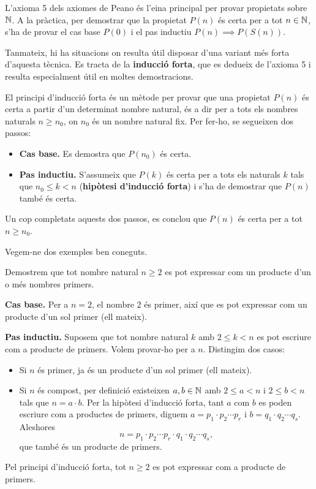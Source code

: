 L'axioma 5 dels axiomes de Peano és l'eina principal per provar propietats sobre $\mathbb{N}$. A la pràctica, per demostrar que la propietat $P(n)$ és certa per a tot $n\in \mathbb{N}$, s'ha de provar el cas base $P(0)$ i el pas inductiu $P(n)\implies P(S(n))$.

Tanmateix, hi ha situacions on resulta útil disposar d'una variant més forta d'aquesta tècnica. Es tracta de la \textbf{inducció forta}, que es dedueix de l'axioma 5 i resulta especialment útil en moltes demostracions.

El principi d'inducció forta és un mètode per provar que una propietat $P(n)$ és certa a partir d'un determinat nombre natural, és a dir per a tots els nombres naturals $n\geq n_0$, on $n_0$ és un nombre natural fix. Per fer-ho, se segueixen dos passos:

\begin{itemize}
\item \textbf{Cas base.} Es demostra que $P(n_0)$ és certa.
\item \textbf{Pas inductiu.} S'assumeix que $P(k)$ és certa per a tots els naturals $k$ tals que $n_0\leq k<n$ (\textbf{hipòtesi d'inducció forta}) i s'ha de demostrar que $P(n)$ també és certa.
\end{itemize}

Un cop completats aquests dos passos, es conclou que $P(n)$ és certa per a tot $n\geq n_0$.

Vegem-ne dos exemples ben coneguts.

\begin{exemple}
Demostrem que tot nombre natural $n\geq 2$ es pot expressar com un producte d'un o més nombres primers.
\end{exemple}

\begin{solucio}
\textbf{Cas base.} Per a $n=2$, el nombre $2$ és primer, així que es pot expressar com un producte d'un sol primer (ell mateix).

\textbf{Pas inductiu.} Suposem que tot nombre natural $k$ amb $2\leq k<n$ es pot escriure com a producte de primers. Volem provar-ho per a $n$. Distingim dos casos:

\begin{itemize}
\item Si $n$ és primer, ja és un producte d'un sol primer (ell mateix).
\item Si $n$ és compost, per definició existeixen $a,b\in \mathbb{N}$ amb $2\leq a<n$ i $2\leq b<n$ tals que $n=a\cdot b$. Per la hipòtesi d'inducció forta, tant $a$ com $b$ es poden escriure com a productes de primers, diguem $a=p_1\cdot p_2\cdots p_r$ i $b=q_1\cdot q_2\cdots q_s$. Aleshores
\[
n=p_1\cdot p_2\cdots p_r\cdot q_1\cdot q_2\cdots q_s,
\]
que també és un producte de primers.
\end{itemize}
Pel principi d'inducció forta, tot $n\geq 2$ es pot expressar com a producte de primers.
\end{solucio}

